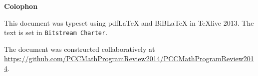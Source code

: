 \thispagestyle{empty}

\mbox{}
\vfill

\mbox{}\hfill\begin{minipage}{.5\textwidth}
	\raggedleft
	{\bfseries\huge Colophon}
	
	This document was typeset using pdf{}\LaTeX{} and BiB\LaTeX{} in \TeX{}live 2013. The text is set 
	in \verb!Bitstream Charter!. 
	
	The document was constructed collaboratively at \url{https://github.com/PCCMathProgramReview2014/PCCMathProgramReview2014}.
\end{minipage}
